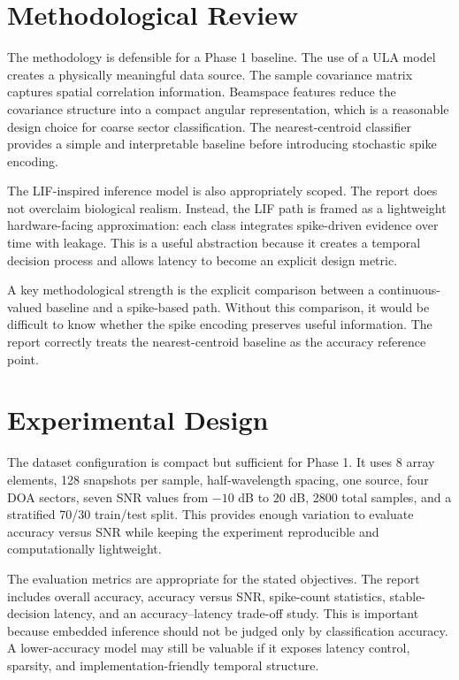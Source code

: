 \documentclass[11pt]{article}
\begin{document}
\section{Methodological Review}

The methodology is defensible for a Phase 1 baseline. The use of a ULA model creates a physically meaningful data source. The sample covariance matrix captures spatial correlation information. Beamspace features reduce the covariance structure into a compact angular representation, which is a reasonable design choice for coarse sector classification. The nearest-centroid classifier provides a simple and interpretable baseline before introducing stochastic spike encoding.

The LIF-inspired inference model is also appropriately scoped. The report does not overclaim biological realism. Instead, the LIF path is framed as a lightweight hardware-facing approximation: each class integrates spike-driven evidence over time with leakage. This is a useful abstraction because it creates a temporal decision process and allows latency to become an explicit design metric.

A key methodological strength is the explicit comparison between a continuous-valued baseline and a spike-based path. Without this comparison, it would be difficult to know whether the spike encoding preserves useful information. The report correctly treats the nearest-centroid baseline as the accuracy reference point.

\section{Experimental Design}

The dataset configuration is compact but sufficient for Phase 1. It uses 8 array elements, 128 snapshots per sample, half-wavelength spacing, one source, four DOA sectors, seven SNR values from $-10$ dB to $20$ dB, 2800 total samples, and a stratified 70/30 train/test split. This provides enough variation to evaluate accuracy versus SNR while keeping the experiment reproducible and computationally lightweight.

The evaluation metrics are appropriate for the stated objectives. The report includes overall accuracy, accuracy versus SNR, spike-count statistics, stable-decision latency, and an accuracy--latency trade-off study. This is important because embedded inference should not be judged only by classification accuracy. A lower-accuracy model may still be valuable if it exposes latency control, sparsity, and implementation-friendly temporal structure.
\end{document}
